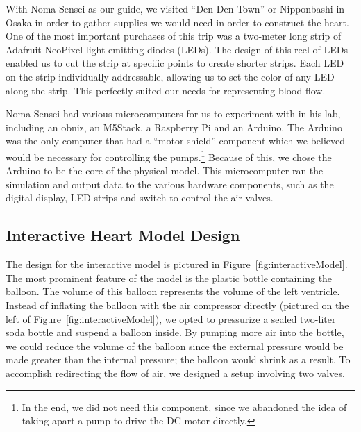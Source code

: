\documentclass[a4paper, 10pt, american, titlepage]{article}
\begin{document}
With Noma Sensei as our guide, we visited ``Den-Den Town'' or Nipponbashi in
Osaka in order to gather supplies we would need in order to construct the heart.
One of the most important purchases of this trip was a two-meter long strip of
Adafruit NeoPixel light emitting diodes (LEDs). The design of this reel of LEDs
enabled us to cut the strip at specific points to create shorter strips. Each
LED on the strip individually addressable, allowing us to set the color of any
LED along the strip. This perfectly suited our needs for representing blood
flow.

Noma Sensei had various microcomputers for us to experiment with in his lab,
including an obniz, an M5Stack, a Raspberry Pi and an Arduino. The Arduino was
the only computer that had a ``motor shield'' component which we believed would
be necessary for controlling the pumps.\footnote{In the end, we did not need
this component, since we abandoned the idea of taking apart a pump to drive the
DC motor directly.} Because of this, we chose the Arduino to be the core of the
physical model. This microcomputer ran the simulation and output data to the
various hardware components, such as the digital display, LED strips and switch
to control the air valves.

\subsection{Interactive Heart Model Design}
\label{sec:interactiveModelDesign}

The design for the interactive model is pictured in
Figure~\ref{fig:interactiveModel}. The most prominent feature of the model is
the plastic bottle containing the balloon. The volume of this balloon represents
the volume of the left ventricle. Instead of inflating the balloon with the air
compressor directly (pictured on the left of Figure~\ref{fig:interactiveModel}),
we opted to pressurize a sealed two-liter soda bottle and suspend a balloon
inside. By pumping more air into the bottle, we could reduce the volume of the
balloon since the external pressure would be made greater than the internal
pressure; the balloon would shrink as a result. To accomplish redirecting the
flow of air, we designed a setup involving two valves.
\end{document}
